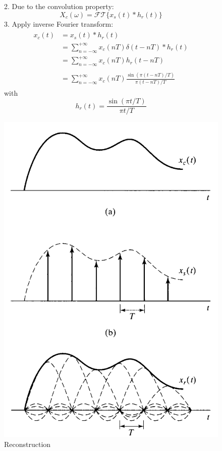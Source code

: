 \documentclass[12pt,a4paper]{article}
\begin{document}
\begin{figure}[H]
\begin{minipage}{0.65\textwidth}
2. Due to the convolution property:
\[ X_{c}(\omega) = \mathcal{FT} \{  x_{s}(t) * h_{r}(t) \} \]
3. Apply inverse Fourier transform:
\begin{align*} \begin{split}
 x_{c}(t)&= x_{s}(t) * h_{r}(t) \\
 &=\sum_{n=-\infty}^{+\infty} x_{c}(nT) \delta(t-nT) * h_{r}(t)\\
 &=\boxed{\sum_{n=-\infty}^{+\infty} x_{c}(nT) h_{r}(t-nT)}\\\\
 &=\sum_{n=-\infty}^{+\infty} x_{c}(nT) \frac{\sin(\pi(t-nT) / T)}{\pi(t-nT) / T}
\end{split}\end{align*}
with \[ h_{r}(t)=\frac{\sin(\pi t/T)}{\pi t/T} \]
\end{minipage} \hfill
\begin{minipage}{0.35\textwidth}
\includegraphics[width = \textwidth]{images/reconstruction2}
\caption{Reconstruction}
\end{minipage}
\end{figure}
\end{document}
